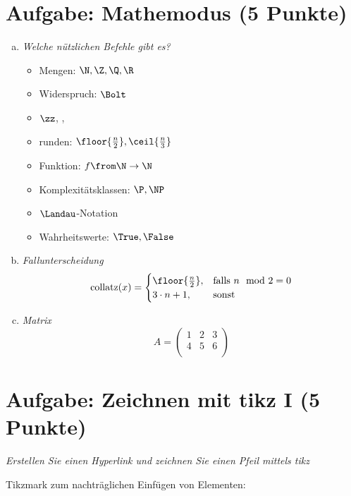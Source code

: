 \section{Aufgabe: Mathemodus \hfill (5 Punkte)}
\begin{enumerate}[a)]
\item {\itshape Welche nützlichen Befehle gibt es?}		%
	\begin{itemize}\setlength{\itemsep}{-1ex}				%
	\item Mengen: $\N, \Z, \Q, \R$
	\item Widerspruch: $\Bolt$
	\item $\zz$, \gdw, \oBdA
	\item runden: $\floor{\frac{n}{2}}, \ceil{\frac{n}{3}}$
	\item Funktion: $f \from \N \to \N$
	\item Komplexitätsklassen: $\P, \NP$
	\item $\Landau$-Notation
	\item Wahrheitswerte: $\True, \False$
	\end{itemize}

\item {\itshape Fallunterscheidung}						%
	\[ \text{collatz}(x) = \begin{cases}
			         \floor{\frac{n}{2}}, & \text{falls } n \mod 2 = 0 \\
			         3\cdot n+1, & \text{sonst} \\
	                \end{cases}
	\]
	
\item {\itshape Matrix}										%
	\[ A = \begin{pmatrix}
		1 & 2 & 3 \\
		4 & 5 & 6 \\
	\end{pmatrix}
	\]
\end{enumerate}

\section{Aufgabe: Zeichnen mit tikz I \hfill (5 Punkte)}
{\itshape Erstellen Sie einen Hyperlink und zeichnen Sie einen Pfeil mittels tikz}

Tikzmark zum nachträglichen Einfügen von Elementen:

